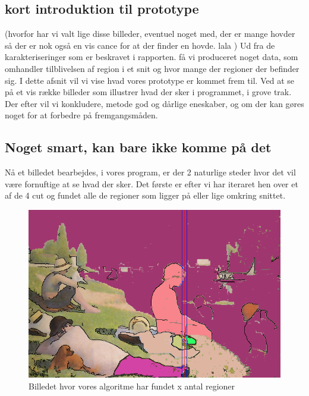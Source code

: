 \subsection{kort introduktion til prototype}
(hvorfor har vi valt lige disse billeder, eventuel noget med, der er mange hovder så der er nok også en vis cance for at der finder en hovde. lala
)
Ud fra de karakteriseringer som er beskravet i rapporten. få vi
produceret noget data, som omhandler tilblivelsen af region i et snit og
hvor mange der regioner der befinder sig. I dette afsnit vil vi vise
hvad vores prototype er kommet frem til. Ved at se på et vis række billeder
som illustrer hvad der sker i programmet, i grove trak. Der efter vil vi
konkludere, metode god og dårlige eneskaber, og om der kan gøres noget for at
forbedre på fremgangsmåden.


\subsection{Noget smart, kan bare ikke komme på det}
Nå et billedet bearbejdes, i vores program, er der 2 naturlige steder
hvor det vil være fornuftige at se hvad der sker. Det første er efter vi har
iteraret hen over et af de 4 cut og fundet alle de regioner som ligger
på eller lige omkring snittet.

\begin{figure}[h!!]
	\begin{center}
		\includegraphics[scale=0.42,angle=0]{afsnit/afprovning/billeder/floodfillbilledet.png}
	\end{center}
	\caption[]{Billedet hvor vores algoritme har fundet x antal regioner}
	\label{ff}
\end{figure}

